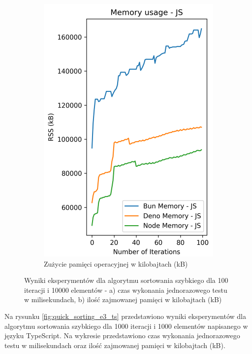 \begin{figure}[H]
\begin{subfigure}[b]{0.4\textwidth}
    \includegraphics[width=\textwidth]{Figures/sorting/sorting_quick_100_10000_js_memory.png}
    \caption{Zużycie pamięci operacyjnej w kilobajtach (kB)}
    \label{fig:quick_sorting_e3_memory}
  \end{subfigure}
  \caption{Wyniki eksperymentów dla algorytmu sortowania szybkiego dla 100 iteracji i 10000 elementów - a) czas wykonania jednorazowego testu w milisekundach, b) ilość zajmowanej pamięci w kilobajtach (kB)}
  \label{fig:quick_sorting_e3}
\end{figure}

Na rysunku \ref{fig:quick_sorting_e3_ts} przedstawiono wyniki eksperymentów dla algorytmu sortowania szybkiego dla 1000 iteracji i 1000 elementów napisanego w języku TypeScript. Na wykresie przedstawiono czas wykonania jednorazowego testu w milisekundach oraz ilość zajmowanej pamięci w kilobajtach (kB).

